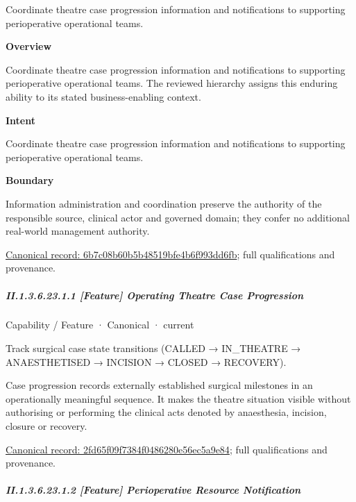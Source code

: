 Coordinate theatre case progression information and notifications to supporting perioperative operational teams.



\textbf{Overview}



Coordinate theatre case progression information and notifications to supporting perioperative operational teams. The reviewed hierarchy assigns this enduring ability to its stated business-enabling context.



\textbf{Intent}



Coordinate theatre case progression information and notifications to supporting perioperative operational teams.



\textbf{Boundary}



Information administration and coordination preserve the authority of the responsible source, clinical actor and governed domain; they confer no additional real-world management authority.


{\footnotesize \href{../../../../continuum/strategy/capability/6b7c08b60b5b48519bfe4b6f993dd6fb.md}{Canonical record: 6b7c08b60b5b48519bfe4b6f993dd6fb}; full qualifications and provenance.}\par
\subparagraph*{II.1.3.6.23.1.1 [Feature] Operating Theatre Case Progression}
\label{navigation:II.1.3.6.23.1.1}

\label{element:2fd65f09f7384f0486280e56ec5a9e84}
{\small Capability / Feature · Canonical · current}\par

Track surgical case state transitions (CALLED → IN\_THEATRE → ANAESTHETISED → INCISION → CLOSED → RECOVERY).



Case progression records externally established surgical milestones in an operationally meaningful sequence. It makes the theatre situation visible without authorising or performing the clinical acts denoted by anaesthesia, incision, closure or recovery.


{\footnotesize \href{../../../../continuum/strategy/capability/feature/2fd65f09f7384f0486280e56ec5a9e84.md}{Canonical record: 2fd65f09f7384f0486280e56ec5a9e84}; full qualifications and provenance.}\par
\subparagraph*{II.1.3.6.23.1.2 [Feature] Perioperative Resource Notification}
\label{navigation:II.1.3.6.23.1.2}

